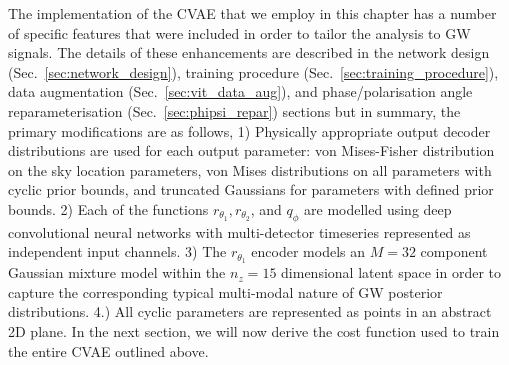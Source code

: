 %
%
The implementation of the \ac{CVAE} that we employ in this chapter has 
a number of specific 
features that were included in order to tailor the analysis to \ac{GW} signals. 
The details of these enhancements are described in the network design 
(Sec.~\ref{sec:network_design}), training procedure
(Sec.~\ref{sec:training_procedure}), data augmentation
(Sec.~\ref{sec:vit_data_aug}), and phase/polarisation angle reparameterisation 
(Sec.~\ref{sec:phipsi_repar}) 
sections but in summary, the 
primary modifications are as follows, 1) Physically appropriate output decoder 
distributions are used for each output parameter: 
von Mises-Fisher distribution on the 
sky location parameters, von Mises distributions on all parameters 
with cyclic prior bounds,  
and truncated Gaussians for
parameters with defined prior bounds. 2) Each of the functions 
$r_{\theta_1},r_{\theta_2}$, and $q_{\phi}$ are modelled using deep 
convolutional neural networks with multi-detector timeseries represented as 
independent input channels. 3) The $r_{\theta_1}$ encoder models an $M=32$ 
component Gaussian mixture model within the $n_{z}=15$ 
dimensional latent space in 
order to capture the corresponding typical multi-modal
nature of \ac{GW} posterior
distributions. 4.) All cyclic parameters are represented as points 
in an abstract 2D plane. In the next section, we will now 
derive the cost function used 
to train the entire \ac{CVAE} outlined above.


